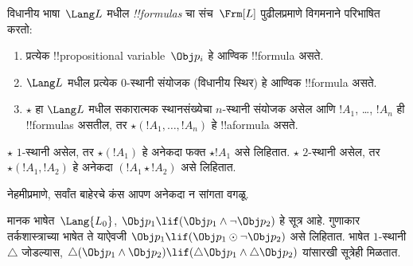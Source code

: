 \documentclass[../../../include/open-logic-section]{subfiles}
\begin{document}


\begin{defn}[सूत्र]
विधानीय भाषा~$\Lang L$ मधील \emph{!!{formula}s} चा संच~$\Frm[L]$
पुढीलप्रमाणे विगमनाने परिभाषित करतो:
\begin{enumerate}
\item प्रत्येक !!{propositional variable}~$\Obj p_i$ हे आण्विक
  !!{formula} असते.
\item $\Lang L$ मधील प्रत्येक $0$-स्थानी संयोजक (विधानीय स्थिर)
  हे आण्विक !!{formula} असते.
\item $\star$ हा $\Lang L$ मधील सकारात्मक स्थानसंख्येचा
  $n$-स्थानी संयोजक असेल आणि
  $!A_1$, \dots, $!A_n$ ही !!{formula}s असतील, तर
  $\star(!A_1, \dots, !A_n)$ हे !!a{formula} असते.
\end{enumerate}
$\star$ $1$-स्थानी असेल, तर $\star(!A_1)$ हे अनेकदा फक्त
$\star !A_1$ असे लिहितात. $\star$ $2$-स्थानी असेल, तर
$\star(!A_1,!A_2)$ हे अनेकदा $(!A_1 \star !A_2)$ असे लिहितात.
\end{defn}

नेहमीप्रमाणे, सर्वांत बाहेरचे कंस आपण अनेकदा न सांगता वगळू.

\begin{ex}
  मानक भाषेत~$\Lang{L_0}$,
  $\Obj p_1 \lif (\Obj p_1 \land \lnot \Obj p_2)$ हे सूत्र आहे.
  गुणाकार तर्कशास्त्राच्या भाषेत ते याऐवजी
  $\Obj p_1 \lif (\Obj p_1 \odot \lnot \Obj p_2)$ असे लिहितात.
  भाषेत $1$-स्थानी $\triangle$ जोडल्यास,
  $\triangle (\Obj p_1 \land \Obj p_2) \lif (\triangle \Obj p_1 \land \triangle \Obj p_2)$
  यांसारखी सूत्रेही मिळतात.
\end{ex}
\end{document}
